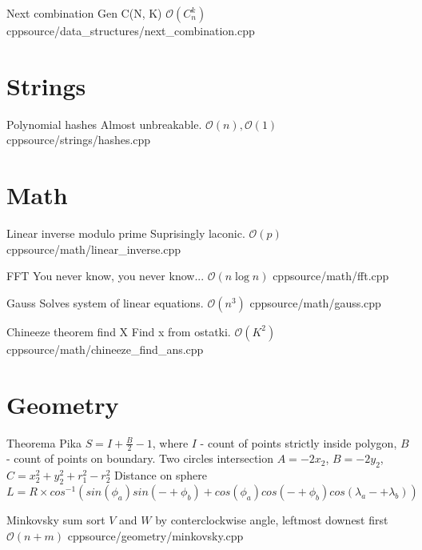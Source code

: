 \documentclass[landscape, 10pt, a4paper, oneside, twocolumn]{extarticle}
\begin{document}
\Algorithm
{Next combination}
{Gen C(N, K)}
{$\mathcal{O}(C_{n}^{k})$}
{cpp}{source/data_structures/next_combination.cpp}




\section{Strings}

\Algorithm
{Polynomial hashes}
{Almost unbreakable.}
{$\mathcal{O}(n), \mathcal{O}(1)$}
{cpp}{source/strings/hashes.cpp}




\section{Math}

\Algorithm
{Linear inverse modulo prime}
{Suprisingly laconic.}
{$\mathcal{O}(p)$}
{cpp}{source/math/linear_inverse.cpp}

\Algorithm
{FFT}
{You never know, you never know...}
{$\mathcal{O}(n \log n)$}
{cpp}{source/math/fft.cpp}

\Algorithm
{Gauss}
{Solves system of linear equations.}
{$\mathcal{O}(n^{3})$}
{cpp}{source/math/gauss.cpp}

\Algorithm
{Chineeze theorem find X}
{Find x from ostatki.}
{$\mathcal{O}(K^{2})$}
{cpp}{source/math/chineeze_find_ans.cpp}



\section{Geometry}

\Algorithm
{Theorema Pika}
{$S = I + \frac{B}{2} - 1$, where $I$ - count of points strictly inside polygon, $B$ - count of points on boundary.}
{Two circles intersection}
{$A = -2 x_{2}$, $B = - 2 y_{2}$, $C = x_{2}^{2} + y_{2}^{2} + r_{1}^{2} - r_{2}^{2}$}
{Distance on sphere}
{$L = R \times cos^{-1}( sin(\phi_{a}) sin(-+ \phi_{b}) + cos(\phi_{a}) cos(-+ \phi_{b}) cos(\lambda_{a} -+ \lambda_{b}) ) $}

\Algorithm
{Minkovsky sum}
{sort $V$ and $W$ by conterclockwise angle, leftmost downest first}
{$\mathcal{O}(n + m)$}
{cpp}{source/geometry/minkovsky.cpp}

\end{document}

